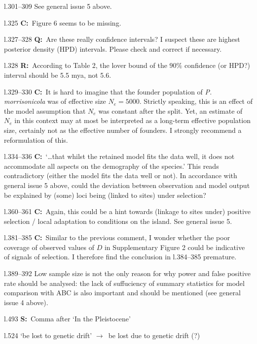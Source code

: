 \documentclass[11pt]{article}
\newenvironment{my_description}
{\begin{description}
  \setlength{\itemsep}{2pt}
  \setlength{\parskip}{0pt}
  \setlength{\parsep}{0pt}}
{\end{description}}
\newcommand{\ra}{$\rightarrow$\ }
\newcommand{\C}{\textbf{C:}\ }
\newcommand{\Q}{\textbf{Q:}\ }
\newcommand{\R}{\textbf{R:}\ }
\newcommand{\V}{\textbf{S:}\ }
\begin{document}
\begin{my_description}
	\item[l.301--309] See general issue 5 above.
	\item[l.325] \C Figure 6 seems to be missing.
	\item[l.327--328] \Q Are these really confidence intervals? I suspect these are highest posterior density (HPD) intervals. Please check and correct if necessary.
	\item[l.328] \R According to Table 2, the lover bound of the $90\%$ confidence (or HPD?) interval should be 5.5 mya, not 5.6.
	\item[l.329--330] \C It is hard to imagine that the founder population of \emph{P. morrisonicola} was of effective size $N_e = 5000$. Strictly speaking, this is an effect of the model assumption that $N_e$ was constant after the split. Yet, an estimate of $N_e$ in this context may at most be interpreted as a long-term effective population size, certainly not as the effective number of founders. I strongly recommend a reformulation of this.
	\item[l.334--336] \C `\dots that whilst the retained model fits the data well, it does not accommodate all aspects on the demography of the species.' This reads contradictory (either the model fits the data well or not). In accordance with general issue 5 above, could the deviation between observation and model output be explained by (some) loci being (linked to sites) under selection?
	\item[l.360--361] \C Again, this could be a hint towards (linkage to sites under) positive selection / local adaptation to conditions on the island. See general issue 5.
	\item[l.381--385] \C Similar to the previous comment, I wonder whether the poor coverage of observed values of $D$ in Supplementary Figure 2 could be indicative of signals of selection. I therefore find the conclusion in l.384--385 premature.
	\item[l.389--392] Low sample size is not the only reason for why power and false positive rate should be analysed: the lack of suffuciency of summary statistics for model comparison with ABC is also important and should be mentioned (see general issue 4 above).
	\item[l.493] \V Comma after `In the Pleistocene'
	\item[l.524] `be lost to genetic drift' \ra be lost due to genetic drift (?)
\end{my_description}
\end{document}
